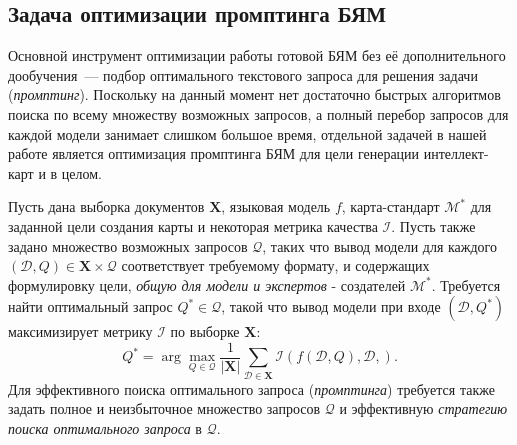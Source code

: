 \documentclass[12pt]{article}
\newcommand{\X}{\mathbf{X}}
\newcommand{\D}{\mathcal{D}}
\newcommand{\M}{\mathcal{M}}
\newcommand{\I}{\mathcal{I}}
\newcommand{\Q}{\mathcal{Q}}
\begin{document}
\subsection{Задача оптимизации промптинга БЯМ}
Основной инструмент оптимизации работы готовой БЯМ без её дополнительного дообучения~--- подбор оптимального текстового запроса для решения задачи (\textit{промптинг}). Поскольку на данный момент нет достаточно быстрых алгоритмов поиска по всему множеству возможных запросов, а полный перебор запросов для каждой модели занимает слишком большое время, отдельной задачей в нашей работе является оптимизация промптинга БЯМ для цели генерации интеллект-карт и в целом.

Пусть дана выборка документов $\X$, языковая модель $f$, карта-стандарт $\M^*$ для заданной цели создания карты и некоторая метрика качества $\I$. Пусть также задано множество возможных запросов $\Q$, таких что вывод модели для каждого $(\D, Q)\in\X\times\Q$ соответствует требуемому формату, и содержащих формулировку цели, \textit{общую для модели и экспертов} - создателей $\M^*$. Требуется найти оптимальный запрос $Q^*\in\Q$, такой что вывод модели при входе $(\D, Q^*)$ максимизирует метрику $\I$ по выборке $\X$:
$$
Q^* = \arg\max\limits_{Q\in\Q} \frac{1}{|\X|}\sum\limits_{\D\in\X} \I(f(\D, Q), \D, ).
$$
Для эффективного поиска оптимального запроса (\textit{промптинга}) требуется также задать полное и неизбыточное множество запросов $\Q$ и эффективную \textit{стратегию поиска оптимального запроса} в $\Q$.
\end{document}
